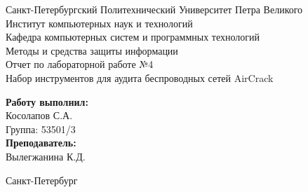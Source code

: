 \documentclass[a4paper]{article}
\begin{document}

\begin{titlepage}	%

	\begin{center}		%

		\large Санкт-Петербургский Политехнический Университет Петра Великого\\
		\large Институт компьютерных наук и технологий \\
		\large Кафедра компьютерных систем и программных технологий\\[6cm]
		
		\huge Методы и средства защиты информации\\[0.5cm] %
		\large Отчет по лабораторной работе №4\\[0.1cm]
		\large Набор инструментов для аудита беспроводных сетей AirCrack\\[5cm]

	\end{center}


	\begin{flushright} %
		\begin{minipage}{0.25\textwidth} %
			\begin{flushleft} %

				\large\textbf{Работу выполнил:}\\
				\large Косолапов С.А.\\
				\large {Группа:} 53501/3\\
				
				\large \textbf{Преподаватель:}\\
				\large Вылегжанина К.Д.

			\end{flushleft}
		\end{minipage}
	\end{flushright}
	
	\vfill %

	\begin{center}
	\large Санкт-Петербург\\
	\large \the\year %
	\end{center} %

\thispagestyle{empty} %
\end{titlepage} %
\end{document}
